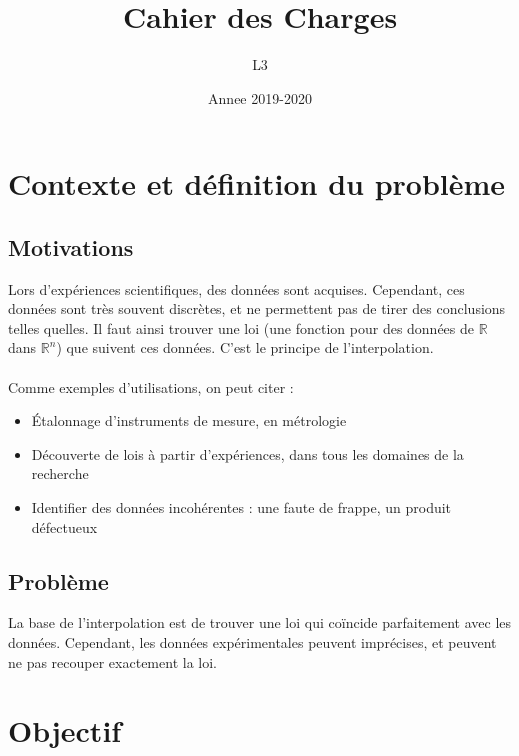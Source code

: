 \documentclass[a4paper,12pt]{article}
\title{Cahier des Charges}
\author{L3}
\date{Annee 2019-2020}
\newcommand{\IKex}[2]{\mathbb{#1}^{#2}}
\newcommand{\IK}[1]{\mathbb{#1}}
\newcommand{\IRex}[1]{\IKex{R}{#1}}
\newcommand{\IR}{\IK{R}}
\begin{document}
\maketitle
\tableofcontents

\newpage

\section{Contexte et définition du problème}

\subsection{Motivations}

Lors d'expériences scientifiques, des données sont acquises. Cependant, ces données sont très souvent discrètes, et ne permettent pas de tirer des conclusions telles quelles. Il faut ainsi trouver une loi (une fonction pour des données de $\IR$ dans $\IRex{n}$) que suivent ces données. C'est le principe de l'interpolation.
\\ \\
Comme exemples d'utilisations, on peut citer :
\begin{itemize}
\item Étalonnage d'instruments de mesure, en métrologie
\item Découverte de lois à partir d'expériences, dans tous les domaines de la recherche
\item Identifier des données incohérentes : une faute de frappe, un produit défectueux
\end{itemize}

\subsection{Problème}

La base de l'interpolation est de trouver une loi qui coïncide parfaitement avec les données. Cependant, les données expérimentales peuvent imprécises, et peuvent ne pas recouper exactement la loi. 

\newpage
\section{Objectif}
\end{document}
